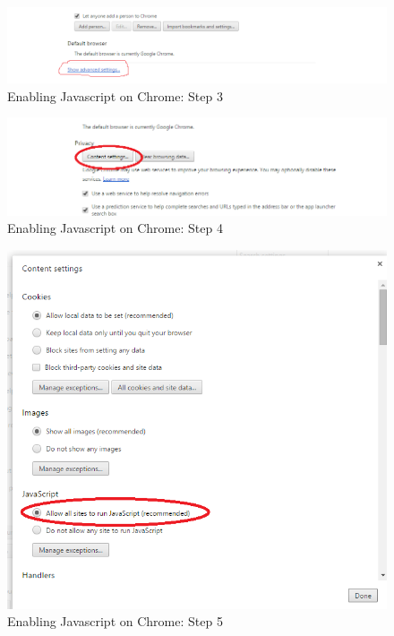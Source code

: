 		\begin{figure}[!h]
		\centering
			\includegraphics[scale=0.5]{images/javascriptChrome3.png}
			\caption{Enabling Javascript on Chrome: Step 3}
		\end{figure}
		
		\begin{figure}[!h]
		\centering
			\includegraphics[scale=0.5]{images/javascriptChrome4.png}
			\caption{Enabling Javascript on Chrome: Step 4}
		\end{figure}
		
		\begin{figure}[!h]
		\centering
			\includegraphics[scale=0.5]{images/javascriptChrome5.png}
			\caption{Enabling Javascript on Chrome: Step 5}
		\end{figure}
		
